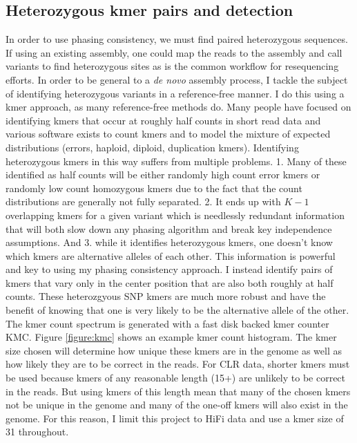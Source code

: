 \subsection{Heterozygous kmer pairs and detection}
\par{
In order to use phasing consistency, we must find paired heterozygous sequences. If using an existing assembly, one could map the reads to the assembly and call variants to find heterozygous sites as is the common workflow for resequencing efforts. In order to be general to a \textit{de novo} assembly process, I tackle the subject of identifying heterozygous variants in a reference-free manner. I do this using a kmer approach, as many reference-free methods do. 
Many people have focused on identifying kmers that occur at roughly half counts in short read data\cite{KAT} and various software exists to count kmers\cite{jellyfish} 
and to model the mixture of expected distributions (errors, haploid, diploid, duplication kmers)\cite{genomescope}. Identifying heterozygous kmers in this way 
suffers from multiple problems. 1. Many of these identified as half counts will be either randomly high count error kmers or randomly low count 
homozygous kmers due to the fact that the count distributions are generally not fully separated. 2. It ends up with $K-1$ overlapping kmers for a given variant which is needlessly redundant information that will both slow down any phasing algorithm and break key independence assumptions. And 3. while it identifies heterozygous kmers, one doesn't know which kmers are alternative alleles of each other. This information is powerful and key to using my phasing consistency approach. 
I instead identify pairs of kmers that vary only in the center position that are also both roughly at half counts. These heterozgyous SNP kmers 
are much more robust and have the benefit of knowing that one is very likely to be the alternative allele of the other. The kmer count spectrum is generated with a fast disk backed kmer counter KMC\cite{kmc}\cite{kmc2}\cite{kmc3}. Figure \ref{figure:kmc} shows an example kmer count histogram. The kmer size chosen will determine how unique these kmers are in the genome as well as how likely they are to be correct in the reads. For CLR data, shorter kmers must be used because kmers of any reasonable length (15+) are unlikely to be correct in the reads. But using kmers of this length mean that many of the chosen kmers not be unique in the genome and many of the one-off kmers will also exist in the genome. For this reason, I limit this project to HiFi data and use a kmer size of 31 throughout.
}

